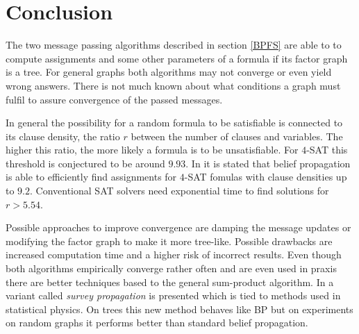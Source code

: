 \chapter{Conclusion}
The two message passing algorithms described in section \ref{BPFS} are able to to compute assignments and some other parameters of a formula if its factor graph is a tree. For general graphs both algorithms may not converge or even yield wrong answers. There is not much known about what conditions a graph must fulfil to assure convergence of the passed messages.

In general the possibility for a random formula to be satisfiable is connected to its clause density, the ratio $r$ between the number of clauses and variables. The higher this ratio, the more likely a formula is to be unsatisfiable.
For $4$-SAT this threshold is  conjectured to be around $9.93$. In \cite{BPGuideMe} it is stated that belief propagation is able to efficiently find assignments for $4$-SAT fomulas with clause densities up to $9.2$. Conventional SAT solvers need exponential time to find solutions for $r > 5.54$.

Possible approaches to improve convergence are damping the message updates or modifying the factor graph to make it more tree-like. Possible drawbacks are increased computation time and a higher risk of incorrect results. \newline
Even though both algorithms empirically converge rather often and are even used in praxis there are better techniques based to the general sum-product algorithm. In \cite{survprob} a variant called \emph{survey propagation} is presented which is tied to methods used in statistical physics. On trees this new method behaves like BP but on experiments on random graphs it performs better than standard belief propagation. 